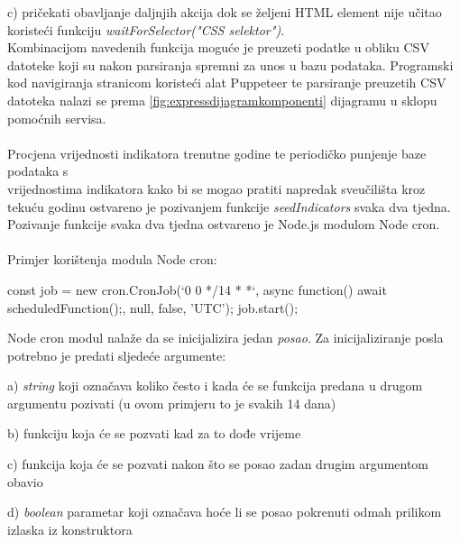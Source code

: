 \documentclass[times, utf8, zavrsni]{fer}
\begin{document}
    c) pričekati obavljanje daljnjih akcija dok se željeni HTML element nije učitao koristeći funkciju \emph{waitForSelector("CSS selektor")}.
\\Kombinacijom navedenih funkcija moguće je preuzeti podatke u obliku CSV datoteke koji su nakon parsiranja spremni za unos u bazu podataka.
Programski kod navigiranja stranicom koristeći alat Puppeteer te parsiranje preuzetih CSV datoteka nalazi se prema \ref{fig:expressdijagramkomponenti}
dijagramu u sklopu pomoćnih servisa.
\\\\Procjena vrijednosti indikatora trenutne godine te periodičko punjenje baze podataka s \\vrijednostima indikatora kako bi se mogao pratiti napredak 
sveučilišta kroz tekuću godinu ostvareno je pozivanjem funkcije \emph{seedIndicators} svaka dva tjedna. Pozivanje funkcije svaka dva tjedna 
ostvareno je Node.js modulom Node cron. 
\\\\Primjer korištenja modula Node cron:
\begin{verbnobox}[\fontsize{10pt}{10pt}\selectfont] 
    const job = new cron.CronJob(`0 0 */14 * *`, 
                            async function() {
                await scheduledFunction();}, 
                null, false, 'UTC');
    job.start();
\end{verbnobox}  
Node cron modul nalaže da se inicijalizira jedan \emph{posao}. Za inicijaliziranje posla potrebno je predati sljedeće argumente:

    a) \emph{string} koji označava koliko često i kada će se funkcija predana u drugom argumentu pozivati (u ovom primjeru to je svakih 14 dana)

    b) funkciju koja će se pozvati kad za to dođe vrijeme

    c) funkcija koja će se pozvati nakon što se posao zadan drugim argumentom obavio 

    d) \emph{boolean} parametar koji označava hoće li se posao pokrenuti odmah prilikom izlaska iz konstruktora
\end{document}
